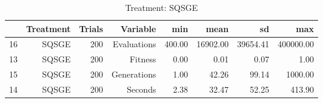 \begin{table}[ht]
\centering
\begin{tabular}{rrrrrrrr}
  \hline
 & Treatment & Trials & Variable & min & mean & sd & max \\ 
  \hline
16 & SQSGE & 200 & Evaluations & 400.00 & 16902.00 & 39654.41 & 400000.00 \\ 
  13 & SQSGE & 200 & Fitness & 0.00 & 0.01 & 0.07 & 1.00 \\ 
  15 & SQSGE & 200 & Generations & 1.00 & 42.26 & 99.14 & 1000.00 \\ 
  14 & SQSGE & 200 & Seconds & 2.38 & 32.47 & 52.25 & 413.90 \\ 
   \hline
\end{tabular}
\caption{Treatment: SQSGE} 
\end{table}

